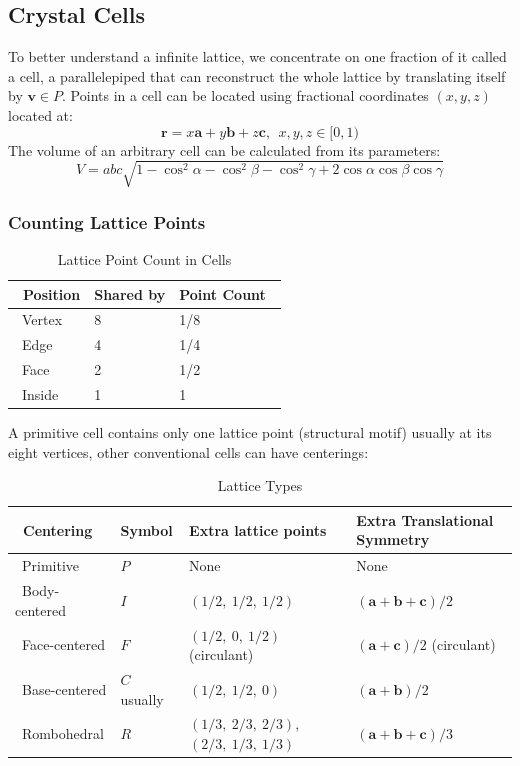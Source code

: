 \subsection{Crystal Cells}
To better understand a infinite lattice, we concentrate on one fraction of it called a cell, 
a parallelepiped that can reconstruct the whole lattice by translating itself by $\mathbf{v}\in P$.
Points in a cell can be located using fractional coordinates $(x, y, z)$ located at:
%
\[
	\mathbf{r}=x\mathbf{a}+y\mathbf{b}+z\mathbf{c},\ \ 
	x,y,z\in[0,1)
\]
%
The volume of an arbitrary cell can be calculated from its parameters:
\[
	V=abc\sqrt{1-\cos^2\alpha-\cos^2\beta-\cos^2\gamma+2\cos\alpha\cos\beta\cos\gamma}
\]
%
\subsubsection{Counting Lattice Points}
%
\begin{table}
	\centering
	\begin{tabular}{@{}lll@{}}
		\toprule
		\ \textbf{Position}	& \textbf{Shared by}	& \textbf{Point Count}\ 	\\
		\midrule
		\ Vertex			& 8						& 1/8						\\
		\ Edge				& 4						& 1/4						\\
		\ Face				& 2						& 1/2						\\
		\ Inside			& 1 					& 1							\\
		\bottomrule
	\end{tabular}
	\caption{Lattice Point Count in Cells}
\end{table}
%
A primitive cell contains only one lattice point (structural motif) 
usually at its eight vertices, other conventional cells can have centerings:
%
\begin{table}
	\centering
	\begin{tabular}{@{}llll@{}}
		\toprule
		\ \textbf{Centering}	& \textbf{Symbol}	& \textbf{Extra lattice points}				& \textbf{Extra Translational Symmetry}\ 	\\
		\midrule
		\ Primitive				& $P$				& None                          			& None										\\
		\ Body-centered			& $I$             	& $(1/2,\ 1/2,\ 1/2)$						& $(\mathbf{a}+\mathbf{b}+\mathbf{c})/2$\	\\
		\ Face-centered			& $F$             	& $(1/2,\ 0,\ 1/2)$ (circulant)				& $(\mathbf{a}+\mathbf{c})/2$ (circulant)\	\\
		\ Base-centered			& $C$ usually		& $(1/2,\ 1/2,\ 0)$							& $(\mathbf{a}+\mathbf{b})/2$ 				\\
		\ Rombohedral			& $R$			 	& $(1/3,\ 2/3,\ 2/3)$, $(2/3,\ 1/3,\ 1/3)$	& $(\mathbf{a}+\mathbf{b}+\mathbf{c})/3$\	\\
		\bottomrule
	\end{tabular}
	\caption{Lattice Types}
\end{table}
